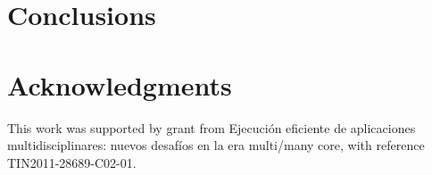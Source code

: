 \documentclass{acm_proc_article-sp}
\begin{document}

\section{Conclusions}

\section{Acknowledgments}
This work was supported by grant from Ejecuci\'on eficiente de aplicaciones multidisciplinares: nuevos desaf\'ios en la era multi/many core, with reference TIN2011-28689-C02-01.
%

%
%
\balancecolumns
\end{document}
